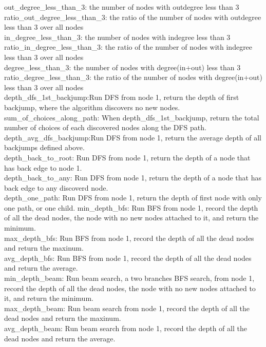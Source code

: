 \documentclass{new_tlp}
\begin{document}
\begin{appendices}
out\_degree\_less\_than\_3: the number of nodes with outdegree less than 3\\
ratio\_out\_degree\_less\_than\_3: the ratio of the number of nodes with outdegree less than 3 over all nodes\\
in\_degree\_less\_than\_3: the number of nodes with indegree less than 3\\
ratio\_in\_degree\_less\_than\_3: the ratio of the number of nodes with indegree less than 3 over all nodes\\
degree\_less\_than\_3: the number of nodes with degree(in+out) less than 3\\
ratio\_degree\_less\_than\_3: the ratio of the number of nodes with degree(in+out) less than 3 over all nodes\\
depth\_dfs\_1st\_backjump:Run DFS from node 1, return the depth of first backjump, where the algorithm discovers no new nodes.\\
sum\_of\_choices\_along\_path: When depth\_dfs\_1st\_backjump, return the total number of choices of each discovered nodes along the DFS path.
depth\_avg\_dfs\_backjump:Run DFS from node 1, return the average depth of all backjumps defined above.\\
depth\_back\_to\_root: Run DFS from node 1, return the depth of a node that has back edge to node 1.\\
depth\_back\_to\_any: Run DFS from node 1, return the depth of a node that has back edge to any discoverd node.\\
depth\_one\_path: Run DFS from node 1, return the depth of first node with only one path, or one child.
min\_depth\_bfs: Run BFS from node 1, record the depth of all the dead nodes, the node with no new nodes attached to it, and return the minimum.\\
max\_depth\_bfs: Run BFS from node 1, record the depth of all the dead nodes and return the maxinum.\\
avg\_depth\_bfs: Run BFS from node 1, record the depth of all the dead nodes and return the average.\\
min\_depth\_beam: Run beam search, a two branches BFS search, from node 1, record the depth of all the dead nodes, the node with no new nodes attached to it, and return the minimum.\\
max\_depth\_beam: Run beam search from node 1, record the depth of all the dead nodes and return the maxinum.\\
avg\_depth\_beam: Run beam search from node 1, record the depth of all the dead nodes and return the average.


\end{appendices}
\end{document}
